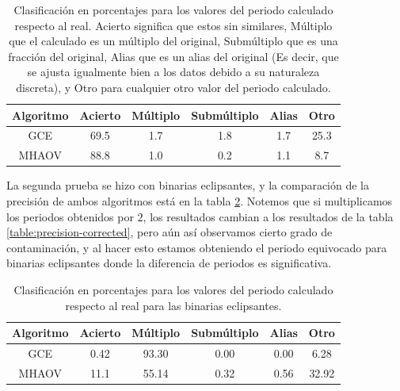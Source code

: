 \begin{table}[H]
\caption{Clasificación en porcentajes para los valores del periodo calculado respecto al real. Acierto significa que estos sin similares, Múltiplo que el calculado es un múltiplo del original, Submúltiplo que es una fracción del original, Alias que es un alias del original (Es decir, que se ajusta igualmente bien a los datos debido a su naturaleza discreta), y Otro para cualquier otro valor del periodo calculado.}
\begin{tabular}{|c|c|c|c|c|c|}
    \hline
    Algoritmo & Acierto & Múltiplo & Submúltiplo & Alias & Otro \\ \hline
    GCE       & 69.5  & 1.7      & 1.8         & 1.7   & 25.3  \\ \hline
    MHAOV     & 88.8  & 1.0      & 0.2         & 1.1   & 8.7   \\ \hline
    \end{tabular}
    \label{table:precision-rrl}
\end{table}
La segunda prueba se hizo con binarias eclipsantes, y la comparación de la precisión de ambos algoritmos está en la tabla \ref{table:precision-eb}. Notemos que si multiplicamos los periodos obtenidos por $2$, los resultados cambian a los resultados de la tabla \ref{table:precision-corrected}, pero aún así observamos cierto grado de contaminación, y al hacer esto estamos obteniendo el periodo equivocado para binarias eclipsantes donde la diferencia de periodos es significativa.


\begin{table}[H]
\caption{Clasificación en porcentajes para los valores del periodo calculado respecto al real para las binarias eclipsantes.}
\begin{tabular}{|c|c|c|c|c|c|}
    \hline
    Algoritmo & Acierto & Múltiplo & Submúltiplo & Alias & Otro \\ \hline
    GCE     & 0.42  & 93.30      & 0.00         & 0.00   & 6.28   \\ \hline
    MHAOV       & 11.1  & 55.14      & 0.32         & 0.56   & 32.92  \\ \hline
    \end{tabular}
    \label{table:precision-eb}
\end{table}

